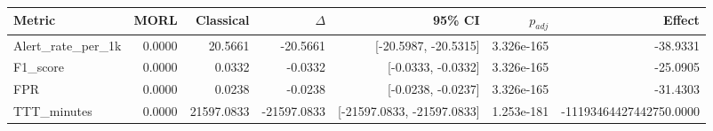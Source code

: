 \begin{tabular}{lrrrrrr}
\hline
Metric & MORL & Classical & $\Delta$ & 95\% CI & $p_{adj}$ & Effect \\
\hline
Alert_rate_per_1k & 0.0000 & 20.5661 & -20.5661 & [-20.5987, -20.5315] & 3.326e-165 & -38.9331 \\
F1_score & 0.0000 & 0.0332 & -0.0332 & [-0.0333, -0.0332] & 3.326e-165 & -25.0905 \\
FPR & 0.0000 & 0.0238 & -0.0238 & [-0.0238, -0.0237] & 3.326e-165 & -31.4303 \\
TTT_minutes & 0.0000 & 21597.0833 & -21597.0833 & [-21597.0833, -21597.0833] & 1.253e-181 & -11193464427442750.0000 \\
\hline
\end{tabular}
